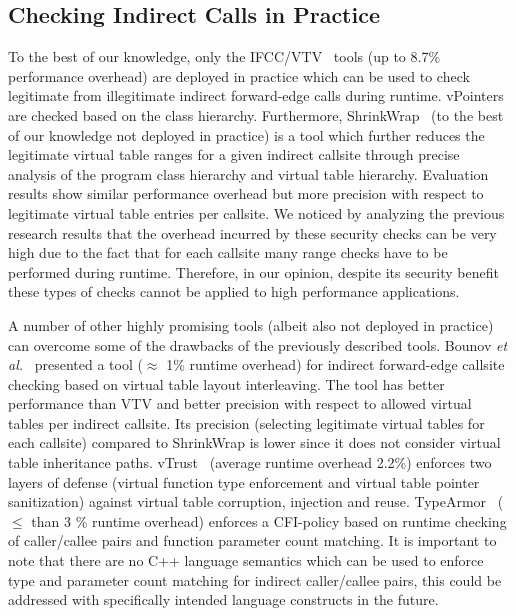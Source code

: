 \subsection{Checking Indirect Calls in Practice}
\label{C++ Indirect Calls in Practice}
To the best of our knowledge, only the IFCC/VTV~\cite{vtv:tice} tools (up to 8.7\% performance overhead) are deployed in practice
which can be used to check legitimate from illegitimate indirect forward-edge calls during runtime. vPointers are checked based on the class hierarchy. Furthermore, ShrinkWrap~\cite{haller:shrinkwrap} (to the best of our knowledge not deployed in practice) is a tool which further reduces the legitimate virtual table ranges for a given indirect callsite through precise analysis of the program class hierarchy and virtual table hierarchy. Evaluation results show similar performance overhead but more precision with respect to legitimate virtual table entries per callsite. We noticed by analyzing the previous research results that the overhead incurred by these security checks can be very high due to the fact that for each callsite many range checks have to be performed during runtime. Therefore, in our opinion, despite its security benefit these types of checks cannot be applied to high performance applications.

A number of other highly promising tools (albeit also not deployed in practice) can overcome some of the drawbacks of the previously described tools. Bounov \textit{et al.}~\cite{bounov:interleaving} presented a tool ($\approx$ 1\% runtime overhead)
for indirect forward-edge callsite checking based on virtual table layout interleaving. The tool has better performance than VTV and better precision with respect to allowed virtual tables per indirect callsite. Its precision (selecting legitimate virtual tables for each callsite) compared to ShrinkWrap is lower since it does not consider virtual table inheritance paths. vTrust~\cite{zhang:vtrust} (average runtime overhead 2.2\%) enforces two layers of defense (virtual function type enforcement and virtual table pointer sanitization) against virtual table corruption, injection and reuse. TypeArmor~\cite{veen:typearmor} ($\le$ than 3 \% runtime overhead) enforces a CFI-policy based on runtime checking of caller/callee pairs and function parameter count matching. It is important to note 
that there are no C++ language semantics which can be used to enforce type and parameter count matching for indirect caller/callee pairs, this could be addressed with specifically intended language constructs in the future.

